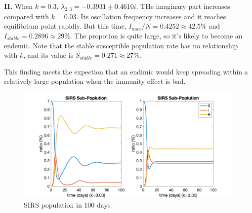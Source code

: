 \documentclass[12pt,a4paper]{article}
\begin{document}
\textbf{II.} When $k=0.3$, $\lambda_{2,3}=-0.3931 \pm 0.4610i$. THe imaginary part increases compared with $k=0.03$. Its oscillation frequency increases and it reaches equilibrium point rapidly. But this time, $I_{max}/N=0.4252\approx 42.5\%$ and $I_{stable}=0.2896\approx 29\%$. The propotion is quite large, so it's likely to become an endemic. Note that the stable susceptible population rate has no relationship with $k$, and its value is $S_{stable}=0.271\approx 27\%$.

This finding meets the expection that an endimic would keep spreading within a relatively large population when the immunity effect is bad.

\begin{figure}[!ht]
    \includegraphics[width=\textwidth]{hw10_8_d.png}
    \caption{SIRS population in 100 days}
\end{figure}
\end{document}
